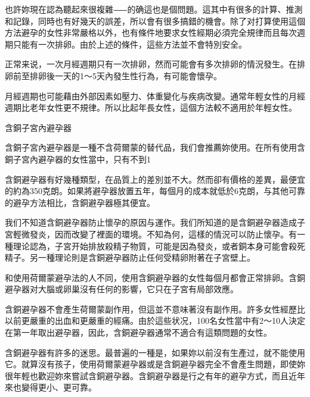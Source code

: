 \documentclass[12pt,UTF8]{ctexbook}
\begin{document}
也許妳現在認為聽起來很複雜⸺的确這也是個問題。這其中有很多的計算、推測和記錄，同時也有好幾天的誤差，所以會有很多搞錯的機會。除了对打算使用這個方法避孕的女性非常嚴格以外，也有條件地要求女性經期必須完全規律而且每次週期只能有一次排卵。由於上述的條件，這些方法並不會特別安全。

正常来说，一次月經週期只有一次排卵，然而可能會有多次排卵的情況發生。在排卵前至排卵後一天的1〜5天內發生性行為，有可能會懷孕。

月經週期也可能藉由外部因素如壓力、体重變化与疾病改變。通常年輕女性的月經週期比老年女性更不規律。所以比起年長女性，這個方法較不適用於年輕女性。





含銅子宮內避孕器




含銅子宮內避孕器是一種不含荷爾蒙的替代品，我们會推薦妳使用。在所有使用含銅子宮內避孕器的女性當中，只有不到1%

含銅避孕器有好幾種類型，在品質上的差別並不大。然而卻有價格的差異，最便宜的約為350克朗。如果將避孕器放置五年，每個月的成本就低於6克朗，与其他可靠的避孕方法相比，含銅避孕器極其便宜。

我们不知道含銅避孕器防止懷孕的原因与運作。我们所知道的是含銅避孕器造成子宮輕微發炎，因而改變了裡面的環境。不知為何，這樣的情況可以防止懷孕。有一種理论認為，子宮开始排放殺精子物質，可能是因為發炎，或者銅本身可能會殺死精子。另一種理论則是含銅避孕器防止任何受精卵附著在子宮壁上。

和使用荷爾蒙避孕法的人不同，使用含銅避孕器的女性每個月都會正常排卵。含銅避孕器对大腦或卵巢沒有任何的影響，它只在子宮有局部效應。

含銅避孕器不會產生荷爾蒙副作用，但這並不意味著沒有副作用。許多女性經歷比以前更嚴重的出血和更嚴重的經痛。由於這些状况，100名女性當中有2〜10人決定在第一年取出避孕器，因此，含銅避孕器通常不適合有這類問題的女性。

含銅避孕器有許多的迷思。最普遍的一種是，如果妳以前沒有生產过，就不能使用它。就算沒有孩子，使用荷爾蒙避孕器或是含銅避孕器完全不會產生問題，即使妳很年輕也歡迎妳來嘗試含銅避孕器。含銅避孕器是行之有年的避孕方式，而且近年來也變得更小、更可靠。
\end{document}
